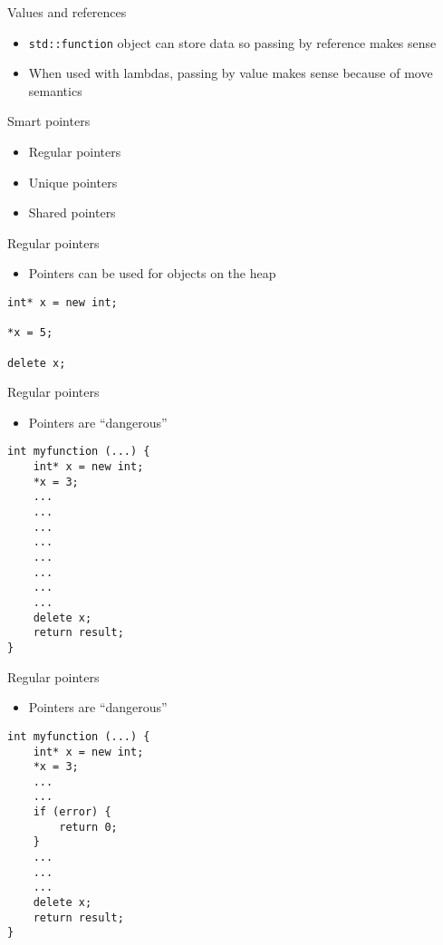 \documentclass[10pt]{beamer}
\begin{document}
\begin{frame}[fragile,label={sec:org9662e44}]{Values and references}
 \begin{itemize}
\item \texttt{std::function} object can store data so passing by reference makes sense
\item When used with lambdas, passing by value makes sense because of \alert{move semantics}
\end{itemize}
\end{frame}
\begin{frame}[label={sec:org8943327}]{Smart pointers}
\begin{itemize}
\item Regular pointers
\item Unique pointers
\item Shared pointers
\end{itemize}
\end{frame}
\begin{frame}[fragile,label={sec:orgf4e0116}]{Regular pointers}
 \begin{itemize}
\item Pointers can be used for objects on the heap
\end{itemize}

\begin{verbatim}
int* x = new int;

*x = 5;

delete x;
\end{verbatim}
\end{frame}

\begin{frame}[fragile,label={sec:org83dccf5}]{Regular pointers}
 \begin{itemize}
\item Pointers are ``dangerous''
\end{itemize}

\begin{verbatim}
int myfunction (...) {
    int* x = new int;
    *x = 3;
    ...
    ...
    ...
    ...
    ...
    ...
    ...
    ...
    delete x;
    return result;
}
\end{verbatim}
\end{frame}

\begin{frame}[fragile,label={sec:org682a477}]{Regular pointers}
 \begin{itemize}
\item Pointers are ``dangerous''
\end{itemize}

\begin{verbatim}
int myfunction (...) {
    int* x = new int;
    *x = 3;
    ...
    ...
    if (error) {
        return 0;
    }
    ...
    ...
    ...
    delete x;
    return result;
}
\end{verbatim}
\end{frame}
\end{document}
